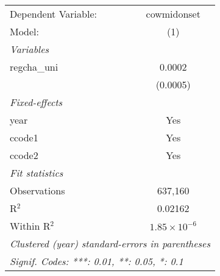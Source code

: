 \begingroup
\centering
\begin{tabular}{lc}
   \tabularnewline \midrule \midrule
   Dependent Variable: & cowmidonset\\  
   Model:              & (1)\\  
   \midrule
   \emph{Variables}\\
   regcha\_uni         & 0.0002\\   
                       & (0.0005)\\   
   \midrule
   \emph{Fixed-effects}\\
   year                & Yes\\  
   ccode1              & Yes\\  
   ccode2              & Yes\\  
   \midrule
   \emph{Fit statistics}\\
   Observations        & 637,160\\  
   R$^2$               & 0.02162\\  
   Within R$^2$        & $1.85\times 10^{-6}$\\   
   \midrule \midrule
   \multicolumn{2}{l}{\emph{Clustered (year) standard-errors in parentheses}}\\
   \multicolumn{2}{l}{\emph{Signif. Codes: ***: 0.01, **: 0.05, *: 0.1}}\\
\end{tabular}
\par\endgroup


